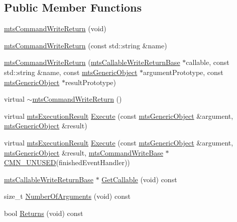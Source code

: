 \subsection*{Public Member Functions}
\begin{DoxyCompactItemize}
\item 
\hyperlink{classmts_command_write_return_a75d7e811da35c3d35a5381d81a723c47}{mts\+Command\+Write\+Return} (void)
\item 
\hyperlink{classmts_command_write_return_a0a42bcea06e94e241b7ee5947db9516b}{mts\+Command\+Write\+Return} (const std\+::string \&name)
\item 
\hyperlink{classmts_command_write_return_a9a99d50207c9f07bd1b1bfe1e5d17ea6}{mts\+Command\+Write\+Return} (\hyperlink{classmts_callable_write_return_base}{mts\+Callable\+Write\+Return\+Base} $\ast$callable, const std\+::string \&name, const \hyperlink{classmts_generic_object}{mts\+Generic\+Object} $\ast$argument\+Prototype, const \hyperlink{classmts_generic_object}{mts\+Generic\+Object} $\ast$result\+Prototype)
\item 
virtual \hyperlink{classmts_command_write_return_a8ef9183a99d604da8e0397728eef559b}{$\sim$mts\+Command\+Write\+Return} ()
\item 
virtual \hyperlink{classmts_execution_result}{mts\+Execution\+Result} \hyperlink{classmts_command_write_return_ad836d1667d7fde4f697ce63e69e0551a}{Execute} (const \hyperlink{classmts_generic_object}{mts\+Generic\+Object} \&argument, \hyperlink{classmts_generic_object}{mts\+Generic\+Object} \&result)
\item 
virtual \hyperlink{classmts_execution_result}{mts\+Execution\+Result} \hyperlink{classmts_command_write_return_a83c18f90db8e763b0d001036e0733f66}{Execute} (const \hyperlink{classmts_generic_object}{mts\+Generic\+Object} \&argument, \hyperlink{classmts_generic_object}{mts\+Generic\+Object} \&result, \hyperlink{classmts_command_write_base}{mts\+Command\+Write\+Base} $\ast$\hyperlink{cmn_portability_8h_a021894e2626935fa2305434b1e893ff6}{C\+M\+N\+\_\+\+U\+N\+U\+S\+E\+D}(finished\+Event\+Handler))
\item 
\hyperlink{classmts_callable_write_return_base}{mts\+Callable\+Write\+Return\+Base} $\ast$ \hyperlink{classmts_command_write_return_ac4b99a5f03b3a1f0f47171b242be6ede}{Get\+Callable} (void) const 
\item 
size\+\_\+t \hyperlink{classmts_command_write_return_aee8e85348044dd4e5b033951bc5e06d9}{Number\+Of\+Arguments} (void) const 
\item 
bool \hyperlink{classmts_command_write_return_a8c026dc9a27616a9ed5714b43ffb9e98}{Returns} (void) const 

\end{DoxyCompactItemize}
